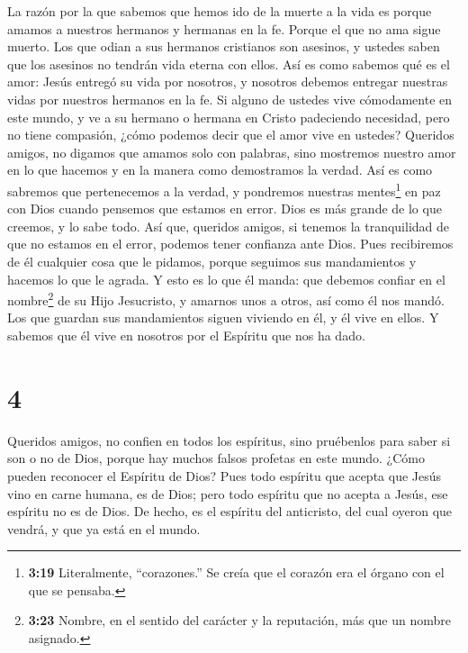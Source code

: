  La razón por la que sabemos que hemos ido de la muerte a
la vida es porque amamos a nuestros hermanos y hermanas en la fe. Porque
el que no ama sigue muerto.  Los que odian a sus hermanos
cristianos son asesinos, y ustedes saben que los asesinos no tendrán
vida eterna con ellos.  Así es como sabemos qué es el amor:
Jesús entregó su vida por nosotros, y nosotros debemos entregar nuestras
vidas por nuestros hermanos en la fe.  Si alguno de ustedes
vive cómodamente en este mundo, y ve a su hermano o hermana en Cristo
padeciendo necesidad, pero no tiene compasión, ¿cómo podemos decir que
el amor vive en ustedes?  Queridos amigos, no digamos que
amamos solo con palabras, sino mostremos nuestro amor en lo que hacemos
y en la manera como demostramos la verdad.  Así es como
sabremos que pertenecemos a la verdad, y pondremos nuestras
mentes\footnote{\textbf{3:19} Literalmente, ``corazones.'' Se creía que
  el corazón era el órgano con el que se pensaba.} en paz con Dios
 cuando pensemos que estamos en error. Dios es más grande
de lo que creemos, y lo sabe todo.  Así que, queridos
amigos, si tenemos la tranquilidad de que no estamos en el error,
podemos tener confianza ante Dios.  Pues recibiremos de él
cualquier cosa que le pidamos, porque seguimos sus mandamientos y
hacemos lo que le agrada.  Y esto es lo que él manda: que
debemos confiar en el nombre\footnote{\textbf{3:23} Nombre, en el
  sentido del carácter y la reputación, más que un nombre asignado.} de
su Hijo Jesucristo, y amarnos unos a otros, así como él nos mandó.
 Los que guardan sus mandamientos siguen viviendo en él, y
él vive en ellos. Y sabemos que él vive en nosotros por el Espíritu que
nos ha dado.

\hypertarget{section-3}{%
\section{4}\label{section-3}}

 Queridos amigos, no confien en todos los espíritus, sino
pruébenlos para saber si son o no de Dios, porque hay muchos falsos
profetas en este mundo.  ¿Cómo pueden reconocer el Espíritu
de Dios? Pues todo espíritu que acepta que Jesús vino en carne humana,
es de Dios;  pero todo espíritu que no acepta a Jesús, ese
espíritu no es de Dios. De hecho, es el espíritu del anticristo, del
cual oyeron que vendrá, y que ya está en el mundo.

